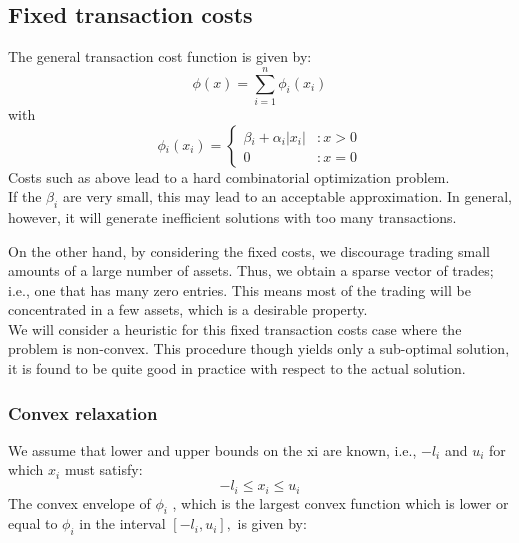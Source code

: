 \documentclass[a4paper]{article}
\begin{document}
\subsection{Fixed transaction costs}

The general transaction cost function is given by:
$$
\phi(x)= \sum_{i=1}^n \phi_i(x_i)
$$
with
\textsc{\[
 \phi_i(x_i) =
  \begin{cases}
   \beta_i + \alpha_i |x_i| & :  x > 0 \\
    0 &: x=0
  \end{cases}
\]
}
Costs such as above lead to a hard combinatorial optimization problem.\\

If the $\beta_i$ are very small, this may lead to an acceptable approximation. In general, however, it will generate inefficient solutions with too many transactions.\cite{2}

On the other hand, by considering the fixed costs, we discourage trading small amounts
of a large number of assets. Thus, we obtain a sparse vector of trades; i.e., one that has many
zero entries. This means most of the trading will be concentrated in a few assets, which is a
desirable property.\\[0.2em]

We will consider a heuristic for this fixed transaction costs case where the problem is non-convex. This procedure though yields only a sub-optimal solution, it is found to be quite good in practice with respect to the actual solution.

\subsubsection{Convex relaxation}

We assume that lower and upper bounds on the xi are known, i.e., $-l_i$ and $u_i$ for which $x_i$ must
satisfy:
$$
-l_i \leq x_i \leq u_i
$$
The convex
envelope of $\phi_i$ , which is the largest convex function which is lower or equal to $\phi_i$ in the interval
$[−l_i, u_i ],$ is given by:
\end{document}
